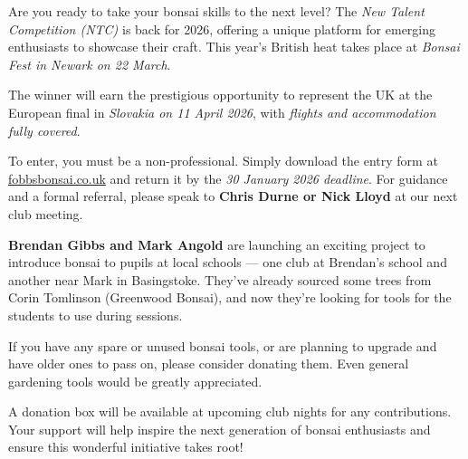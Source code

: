 \label{2025-12-news}

\noindent
Are you ready to take your bonsai skills to the next level?
The \textit{New Talent Competition (NTC)} is back for 2026, offering a unique platform for emerging enthusiasts to showcase their craft.
This year's British heat takes place at \textit{Bonsai Fest in Newark on 22 March}.

The winner will earn the prestigious opportunity to represent the UK at the European final in \textit{Slovakia on 11 April 2026}, with \textit{flights and accommodation fully covered}.

To enter, you must be a non\--professional.
Simply download the entry form at \href{https://fobbsbonsai.co.uk}{fobbsbonsai.co.uk} and return it by the \textit{30 January 2026 deadline}.
For guidance and a formal referral, please speak to \textbf{Chris Durne or Nick Lloyd} at our next club meeting.

\noindent
\textbf{Brendan Gibbs and Mark Angold} are launching an exciting project to introduce bonsai to pupils at local schools --- one club at Brendan's school and another near Mark in Basingstoke. They've already sourced some trees from Corin Tomlinson (Greenwood Bonsai), and now they're looking for tools for the students to use during sessions.

If you have any spare or unused bonsai tools, or are planning to upgrade and have older ones to pass on, please consider donating them. Even general gardening tools would be greatly appreciated.

A donation box will be available at upcoming club nights for any contributions. Your support will help inspire the next generation of bonsai enthusiasts and ensure this wonderful initiative takes root!


	
